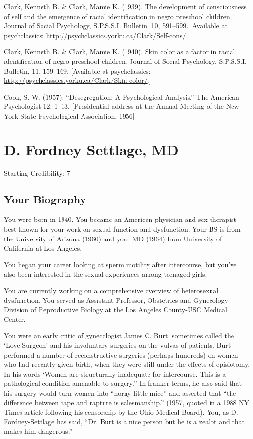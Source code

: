 \begin{refsection}
Clark, Kenneth B. \& Clark, Mamie K. (1939). The development of consciousness of self and the emergence of racial identification in negro preschool children. Journal of Social Psychology, S.P.S.S.I. Bulletin, 10, 591--599. [Available at psychclassics: \url{http://psychclassics.yorku.ca/Clark/Self-cons/}.]

Clark, Kenneth B. \& Clark, Mamie K. (1940). Skin color as a factor in racial identification of negro preschool children. Journal of Social Psychology, S.P.S.S.I. Bulletin, 11, 159--169. [Available at psychclassics: \url{http://psychclassics.yorku.ca/Clark/Skin-color/}.]

Cook, S. W. (1957). ``Desegregation: A Psychological Analysis.'' The American Psychologist 12: 1--13. [Presidential address at the Annual Meeting of the New York State Psychological Association, 1956]

\chapter{D. Fordney Settlage, MD}
\label{d.fordneysettlagemd}

Starting Credibility: 7

\section{Your Biography}
\label{yourbiography}

You were born in 1940. You became an American physician and sex therapist best known for your work on sexual function and dysfunction. Your BS is from the University of Arizona (1960) and your MD (1964) from University of California at Los Angeles.

You began your career looking at sperm motility after intercourse, but you've also been interested in the sexual experiences among teenaged girls.

You are currently working on a comprehensive overview of heterosexual dysfunction. You served as Assistant Professor, Obstetrics and Gynecology Division of Reproductive Biology at the Los Angeles County-USC Medical Center.

You were an early critic of gynecologist James C. Burt, sometimes called the `Love Surgeon' and his involuntary surgeries on the vulvas of patients. Burt performed a number of reconstructive surgeries (perhaps hundreds) on women who had recently given birth, when they were still under the effects of episiotomy. In his words `Women are structurally inadequate for intercourse. This is a pathological condition amenable to surgery.'' In franker terms, he also said that his surgery would turn women into ``horny little mice'' and asserted that ``the difference between rape and rapture is salesmanship.'' (1957, quoted in a 1988 NY Times article following his censorship by the Ohio Medical Board). You, as D. Fordney-Settlage has said, ``Dr. Burt is a nice person but he is a zealot and that makes him dangerous.''


\end{refsection}
